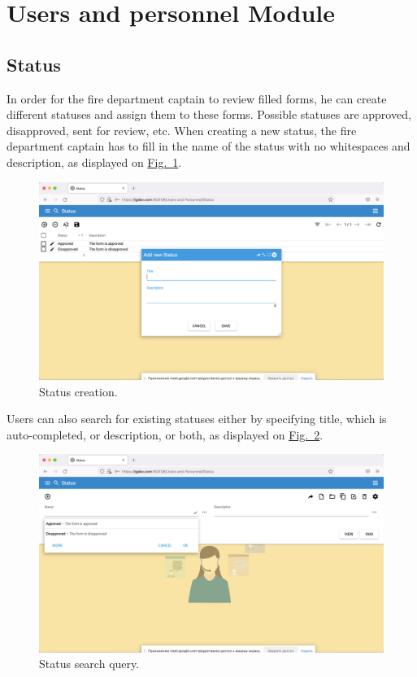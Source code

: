 \section{Users and personnel Module}\label{sec:01}
\subsection{Status}

In order for the fire department captain to review filled forms, he can create different statuses and assign them to these forms. Possible statuses are approved, disapproved, sent for review, etc. When creating a new status, the fire department captain has to fill in the name of the status with no whitespaces and description, as displayed on
\hyperref[sections/personnel/images/16]{Fig.~\ref*{sections/personnel/images/16}}.

\begin{figure}[!htbp]
\centering
\includegraphics[width=0.95\linewidth]{sections/personnel/images/16.png}
\caption{Status creation.}\label{sections/personnel/images/16}
\end{figure}

\newpage
Users can also search for existing statuses either by specifying title, which is auto-completed, or description, or both, as displayed on
\hyperref[sections/personnel/images/17]{Fig.~\ref*{sections/personnel/images/17}}.

\begin{figure}[!htbp]
\centering
\includegraphics[width=0.95\linewidth]{sections/personnel/images/17.png}
\caption{Status search query.}\label{sections/personnel/images/17}
\end{figure}

